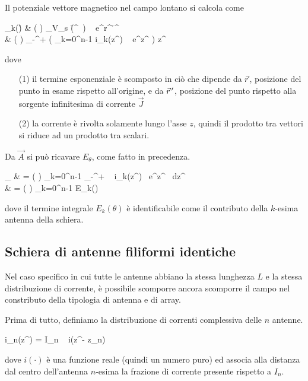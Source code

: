 		Il potenziale vettore magnetico nel campo lontano si calcola come
		\begin{esp}
			_k(\r)
				&  \frac{\mu}{4\pi}
				\left(  \right)
				\int_{V_s} (\r^{\, \prime})
					~ e^{\jmath \beta r^\prime \cos \theta} \de \r^{\, \prime} \\
				&  \frac{\mu}{4\pi}
				\left(  \right) \hat{z}
				\int_{-\infty}^{+\infty}
					\left( \sum_{k=0}^{n-1} i_k(z^\prime) ~ e^{\jmath \beta z^\prime \cos \theta} \right)
					\de z^\prime
		\end{esp}
		dove
		\begin{itemize}
			\item[(1)] il termine esponenziale è scomposto in ciò che dipende da $\vec{r}$, posizione del punto in esame rispetto all'origine, e da $\vec{r}^{\,\prime}$, posizione del punto rispetto alla sorgente infinitesima di corrente $\vec{J}$
			\item[(2)] la corrente è rivolta solamente lungo l'asse $z$, quindi il prodotto tra vettori si riduce ad un prodotto tra scalari.
		\end{itemize}

		Da $\vec{A}$ si può ricavare $E_\theta$, come fatto in precedenza.
		\begin{esp} \label{eq:e_theta_schiera_dipoli}
			\vec{E}_\theta
			& = \jmath \frac{\eta_0}{2\lambda}
					\left( \frac{e^{-\jmath \beta r}}{r} \right)
					\sum_{k=0}^{n-1}
						\int_{-\infty}^{+\infty}  ~ i_k(z^\prime) \, e^{\jmath \beta z^\prime \cos \theta} ~dz^\prime \,  \\
			& = \jmath \frac{\eta_0}{2\lambda}
					\left( \frac{e^{-\jmath \beta r}}{r} \right)
					\sum_{k=0}^{n-1} E_k(\theta) \\
		\end{esp}
		dove il termine integrale $E_k(\theta)$ è identificabile come il contributo della $k$-esima antenna della schiera.

	\subsection{Schiera di antenne filiformi identiche}
		Nel caso specifico in cui tutte le antenne abbiano la stessa lunghezza $L$ e la stessa distribuzione di corrente, è possibile scomporre ancora scomporre il campo nel constributo della tipologia di antenna e di array.

		Prima di tutto, definiamo la distribuzione di correnti complessiva delle $n$ antenne.
		\begin{esp}
			i_n(z^\prime) = I_n ~ i(z^\prime - z_n)
		\end{esp}
		dove $i(\cdot)$ è una funzione reale (quindi un numero puro) ed associa alla distanza dal centro dell'antenna $n$-esima la frazione di corrente presente rispetto a $I_n$.

